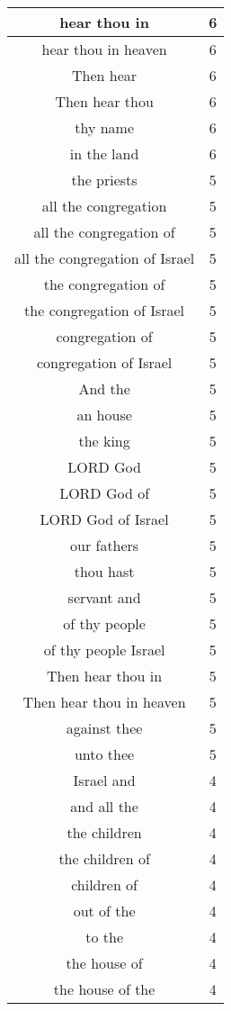 \begin{center}
\begin{longtable}{|c|c|}
hear thou in & 6\\ \hline 
hear thou in heaven & 6\\ \hline 
Then hear & 6\\ \hline 
Then hear thou & 6\\ \hline 
thy name & 6\\ \hline 
in the land & 6\\ \hline 
the priests & 5\\ \hline 
all the congregation & 5\\ \hline 
all the congregation of & 5\\ \hline 
all the congregation of Israel & 5\\ \hline 
the congregation of & 5\\ \hline 
the congregation of Israel & 5\\ \hline 
congregation of & 5\\ \hline 
congregation of Israel & 5\\ \hline 
And the & 5\\ \hline 
an house & 5\\ \hline 
the king & 5\\ \hline 
LORD God & 5\\ \hline 
LORD God of & 5\\ \hline 
LORD God of Israel & 5\\ \hline 
our fathers & 5\\ \hline 
thou hast & 5\\ \hline 
servant and & 5\\ \hline 
of thy people & 5\\ \hline 
of thy people Israel & 5\\ \hline 
Then hear thou in & 5\\ \hline 
Then hear thou in heaven & 5\\ \hline 
against thee & 5\\ \hline 
unto thee & 5\\ \hline 
Israel and & 4\\ \hline 
and all the & 4\\ \hline 
the children & 4\\ \hline 
the children of & 4\\ \hline 
children of & 4\\ \hline 
out of the & 4\\ \hline 
to the & 4\\ \hline 
the house of & 4\\ \hline 
the house of the & 4\\ \hline 

\end{longtable}
\end{center}
